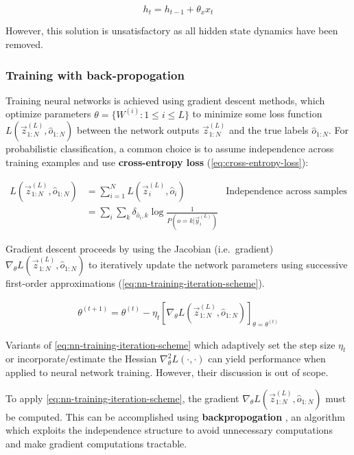 \begin{equation}
    h_t = h_{t-1} + \theta_x x_t
\end{equation}

However, this solution is unsatisfactory as all hidden state dynamics have been
removed.


\subsubsection{Training with back-propogation}

Training neural networks is achieved using gradient descent methods, which
optimize parameters $\theta = \{W^{(i)} : 1 \leq i \leq L \}$ to minimize some
loss function $L(\vec{z}^{(L)}_{1:N}, \hat{o}_{1:N})$ between the network
outputs $\vec{z}^{(L)}_{1:N}$ and the true labels $\hat{o}_{1:N}$. For
probabilistic classification, a common choice is to assume independence
across training examples and use \textbf{cross-entropy loss}
(\autoref{eq:cross-entropy-loss}):

\begin{align}
    L(\vec{z}^{(L)}_{1:N}, \hat{o}_{1:N})
    &= \sum_{i=1}^{N} L(\vec{z}^{(L)}_i, \hat{o}_i) &\mbox{Independence across samples} \nonumber\\
    &= \sum_i \sum_k \delta_{\hat{o}_i,k} \log \frac{1}{P(o=k | \vec{y}_i^{(L)})} & \label{eq:cross-entropy-loss}
\end{align}

Gradient descent proceeds by using the Jacobian (i.e.\ gradient) $\nabla_\theta
L(\vec{z}^{(L)}_{1:N}, \hat{o}_{1:N})$ to iteratively update the network
parameters using successive first-order approximations (\autoref{eq:nn-training-iteration-scheme}).

\begin{align}
    \label{eq:nn-training-iteration-scheme}
    \theta^{(t+1)} = \theta^{(t)}
    - \eta_t \left[ \nabla_\theta L(\vec{z}^{(L)}_{1:N}, \hat{o}_{1:N}) \right]_{\theta = \theta^{(t)}}
\end{align}

Variants of \autoref{eq:nn-training-iteration-scheme} which adaptively set the
step size $\eta_t$ or incorporate/estimate the Hessian $\nabla^2_{\theta}
L(\cdot, \cdot)$ can yield performance when applied to neural network training.
However, their discussion is out of scope. 

To apply \autoref{eq:nn-training-iteration-scheme}, the gradient $\nabla_\theta
L(\vec{z}^{(L)}_{1:N}, \hat{o}_{1:N})$ must be computed. This can be
accomplished using \textbf{backpropogation} , an algorithm which
exploits the independence structure to avoid unnecessary computations and make
gradient computations tractable.

